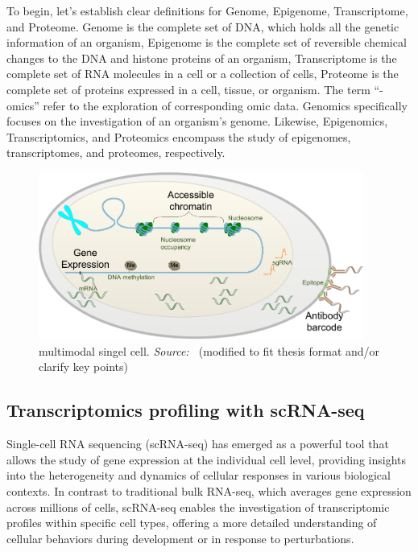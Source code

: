 To begin, let's establish clear definitions for Genome, Epigenome, Transcriptome, and Proteome. Genome is the complete set of DNA, which holds all the genetic information of an organism\citep{hubbard2002genome}, Epigenome is the complete set of reversible chemical changes to the DNA and histone proteins of an organism\citep{bernstein2007epigenome}, Transcriptome is the complete set of RNA molecules in a cell or a collection of cells\citep{haoudi2006proteome}, Proteome is the complete set of proteins expressed in a cell, tissue, or organism\citep{wang2009transcriptome}. The term “-omics” refer to the exploration of corresponding omic data. Genomics specifically focuses on the investigation of an organism's genome.  Likewise, Epigenomics, Transcriptomics, and Proteomics encompass the study of epigenomes, transcriptomes, and proteomes, respectively.

\begin{figure}[!ht]
	\centering
	\includegraphics[width=0.95\textwidth]{multimodal-single-cell/fig}
	\vspace{0.1cm}
	\caption[open chromatin, transcriptome, and surface protein profiling in a single celll.]{multimodal singel cell. \emph{Source: ~\citep{zhu2020single}}(modified to fit thesis format and/or clarify key points)}
	\label{fig:multimodal_single_cell}
\end{figure}

\subsection{Transcriptomics profiling with scRNA-seq}
\label{background:sec1:scRNA}

Single-cell RNA sequencing (scRNA-seq)\citep{singlecellsequencing2014, singlecellsequencing2015} has emerged as a powerful tool that allows the study of gene expression at the individual cell level, providing insights into the heterogeneity and dynamics of cellular responses in various biological contexts. In contrast to traditional bulk RNA-seq, which averages gene expression across millions of cells, scRNA-seq enables the investigation of transcriptomic profiles within specific cell types, offering a more detailed understanding of cellular behaviors during development or in response to perturbations.

